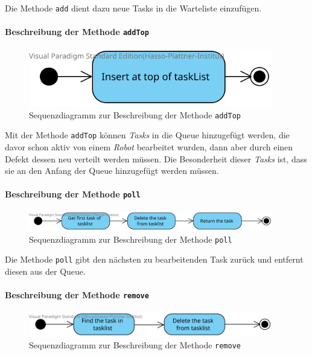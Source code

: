			Die Methode \texttt{add} dient dazu neue Tasks in die Warteliste einzufügen.
			
			\paragraph{Beschreibung der Methode \texttt{addTop}}		
			\begin{figure}[H]
			\centering
			\includegraphics[width=0.95\textwidth]{img/addTop}
			\caption{Sequenzdiagramm zur Beschreibung der Methode \texttt{addTop}}
			\label{SequenzQueueAddTop}
			\end{figure}			
			
			Mit der Methode \texttt{addTop} können \textit{Tasks} in die Queue hinzugefügt werden, die davor schon aktiv von einem \textit{Robot} bearbeitet wurden, dann aber durch einen Defekt dessen neu verteilt werden müssen. 
			Die Besonderheit dieser \textit{Tasks} ist, dass sie an den Anfang der Queue hinzugefügt werden müssen.
				
			\paragraph{Beschreibung der Methode \texttt{poll}}		
			\begin{figure}[H]
			\centering
			\includegraphics[width=0.95\textwidth]{img/2-Entwurf-poll}
			\caption{Sequenzdiagramm zur Beschreibung der Methode \texttt{poll}}
			\label{SequenzQueuePoll}
			\end{figure}			
			
			Die Methode \texttt{poll} gibt den nächsten zu bearbeitenden Task zurück und entfernt diesen aus der Queue.
				
			\paragraph{Beschreibung der Methode \texttt{remove}}		
			\begin{figure}[H]
			\centering
			\includegraphics[width=0.95\textwidth]{img/2-Entwurf-remove}
			\caption{Sequenzdiagramm zur Beschreibung der Methode \texttt{remove}}
			\label{SequenzQueueRemove}
			\end{figure}			
			
